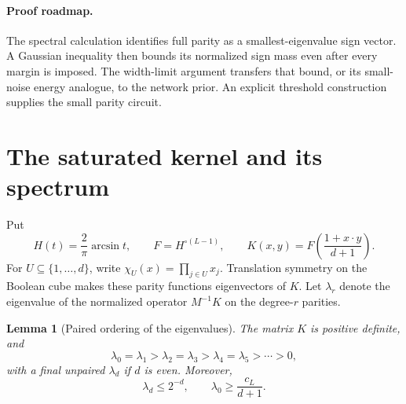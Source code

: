 \documentclass[11pt]{article}
\newtheorem{lemma}[theorem]{Lemma}
\theoremstyle{remark}
\begin{document}
\paragraph{Proof roadmap.}
The spectral calculation identifies full parity as a smallest-eigenvalue
sign vector. A Gaussian inequality then bounds its normalized sign mass
even after every margin is imposed. The width-limit argument transfers
that bound, or its small-noise energy analogue, to the network prior.
An explicit threshold construction supplies the small parity circuit.

\section{The saturated kernel and its spectrum}

Put
\begin{equation}\label{eq:kernel}
 H(t)=\frac2\pi\arcsin t,\qquad
 F=H^{\circ(L-1)},\qquad
 K(x,y)=F\!\left(\frac{1+x\cdot y}{d+1}\right).
\end{equation}
For $U\subseteq\{1,\ldots,d\}$, write
$\chi_U(x)=\prod_{j\in U}x_j$. Translation symmetry on the Boolean
cube makes these parity functions eigenvectors of $K$. Let
$\lambda_r$ denote the eigenvalue of the normalized operator
$M^{-1}K$ on the degree-$r$ parities.

\begin{lemma}[Paired ordering of the eigenvalues]\label{lem:spectrum}
The matrix $K$ is positive definite, and
\begin{equation}\label{eq:paired}
 \lambda_0=\lambda_1>\lambda_2=\lambda_3>
 \lambda_4=\lambda_5>\cdots>0,
\end{equation}
with a final unpaired $\lambda_d$ if $d$ is even. Moreover,
\begin{equation}\label{eq:spectral-bounds}
 \lambda_d\le2^{-d},\qquad
 \lambda_0\ge\frac{c_L}{d+1}.
\end{equation}
\end{lemma}
\end{document}
